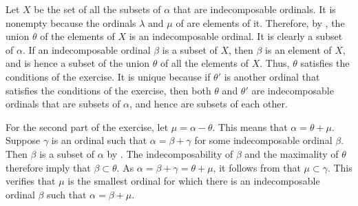 \documentclass{article}
\begin{document}
\begin{solution}[\ref{exe:726wa6d5}]
  \label{sol:a6k309qx}
  Let \(X\) be the set of all the subsets of \(\alpha\) that are
  indecomposable ordinals.  It is nonempty because the ordinals
  \(\lambda\) and \(\mu\) of  are elements of it.
  Therefore, by , the union \(\theta\) of the
  elements of \(X\) is an indecomposable ordinal.  It is clearly a
  subset of \(\alpha\).  If an indecomposable ordinal \(\beta\) is a
  subset of \(X\), then \(\beta\) is an element of \(X\), and is hence
  a subset of the union \(\theta\) of all the elements of \(X\).
  Thus, \(\theta\) satisfies the conditions of the exercise.  It is
  unique because if \(\theta'\) is another ordinal that satisfies the
  conditions of the exercise, then both \(\theta\) and \(\theta'\) are
  indecomposable ordinals that are subsets of \(\alpha\), and hence
  are subsets of each other.

  For the second part of the exercise, let \(\mu = \alpha - \theta\).
  This means that \(\alpha = \theta + \mu\).  Suppose \(\gamma\) is an
  ordinal such that \(\alpha = \beta + \gamma\) for some
  indecomposable ordinal \(\beta\).  Then \(\beta\) is a subset of
  \(\alpha\) by .  The indecomposability of
  \(\beta\) and the maximality of \(\theta\) therefore imply that
  \(\beta \subset \theta\).  As
  \(\alpha = \beta + \gamma = \theta + \mu\), it follows from
   that \(\mu \subset \gamma\).  This verifies that
  \(\mu\) is the smallest ordinal for which there is an indecomposable
  ordinal \(\beta\) such that \(\alpha = \beta + \mu\).
\end{solution}
\end{document}
